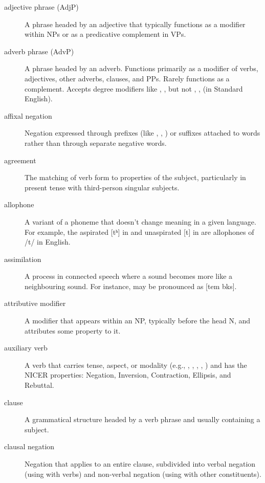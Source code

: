  \label{ch:glossary}

\begin{description}

\item[adjective phrase (AdjP)] A phrase headed by an adjective that typically functions as a modifier within NPs or as a predicative complement in VPs.

\item[adverb phrase (AdvP)] A phrase headed by an adverb. Functions primarily as a modifier of verbs, adjectives, other adverbs, clauses, and PPs. Rarely functions as a complement. Accepts degree modifiers like , ,  but not , ,  (in Standard English).

\item[affixal negation] Negation expressed through prefixes (like , , ) or suffixes attached to words rather than through separate negative words.

\item[agreement] The matching of verb form to properties of the subject, particularly in present tense with third-person singular subjects.

\item[allophone] A variant of a phoneme that doesn't change meaning in a given language. For example, the aspirated [tʰ] in  and unaspirated [t] in  are allophones of /t/ in English.

\item[assimilation] A process in connected speech where a sound becomes more like a neighbouring sound. For instance,  may be pronounced as [tem b\textupsilon ks].

\item[attributive modifier] A modifier that appears within an NP, typically before the head N, and attributes some property to it.

\item[auxiliary verb] A verb that carries tense, aspect, or modality (e.g., , , , , ) and has the NICER properties: Negation, Inversion, Contraction, Ellipsis, and Rebuttal.

\item[clause] A grammatical structure headed by a verb phrase and usually containing a subject.

\item[clausal negation] Negation that applies to an entire clause, subdivided into verbal negation (using  with verbs) and non-verbal negation (using  with other constituents).


\end{description}
